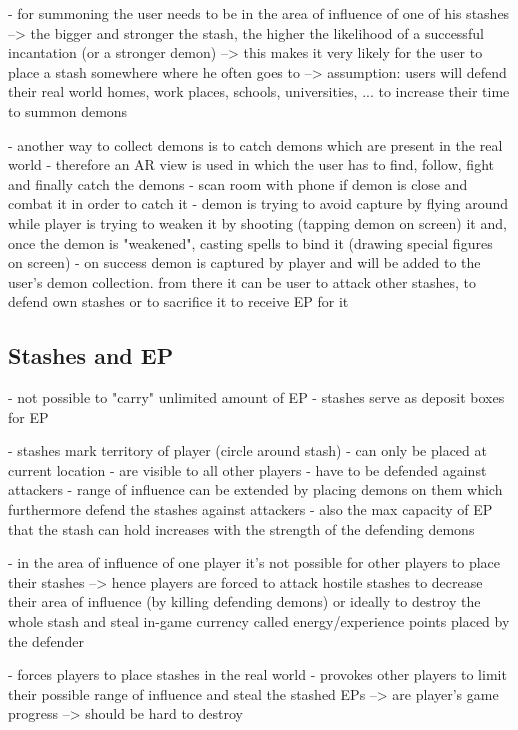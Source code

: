 - for summoning the user needs to be in the area of influence of one of his stashes --> the bigger and stronger the stash, the higher the likelihood of a successful incantation (or a stronger demon)
--> this makes it very likely for the user to place a stash somewhere where he often goes to 
--> assumption: users will defend their real world homes, work places, schools, universities, ... to increase their time to summon demons

- another way to collect demons is to catch demons which are present in the real world
- therefore an AR view is used in which the user has to find, follow, fight and finally catch the demons
- scan room with phone if demon is close and combat it in order to catch it
- demon is trying to avoid capture by flying around while player is trying to weaken it by shooting (tapping demon on screen) it and, once the demon is "weakened", casting spells to bind it (drawing special figures on screen)
- on success demon is captured by player and will be added to the user's demon collection. from there it can be user to attack other stashes, to defend own stashes or to sacrifice it to receive EP for it

\subsection{Stashes and EP}
\label{subsec:stashesandep}

- not possible to "carry" unlimited amount of EP 
- stashes serve as deposit boxes for EP

- stashes mark territory of player (circle around stash)
- can only be placed at current location
- are visible to all other players 
- have to be defended against attackers
- range of influence can be extended by placing demons on them which furthermore defend the stashes against attackers 
- also the max capacity of EP that the stash can hold increases with the strength of the defending demons

- in the area of influence of one player it's not possible for other players to place their stashes --> hence players are forced to attack hostile stashes to decrease their area of influence (by killing defending demons) or ideally to destroy the whole stash and steal in-game currency called energy/experience points placed by the defender

- forces players to place stashes in the real world 
- provokes other players to limit their possible range of influence and steal the stashed EPs
--> are player's game progress
--> should be hard to destroy

